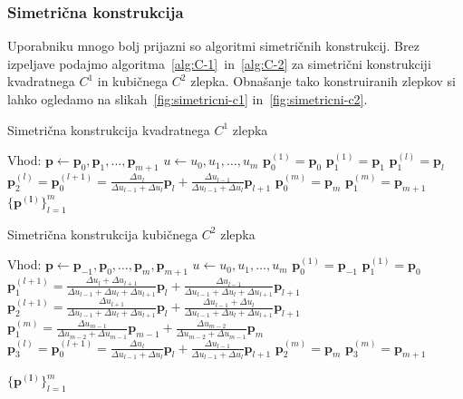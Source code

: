 \documentclass[isrm2, tisk]{fmfdelo}
\newcommand{\p}{\mathbf{p}}
\begin{document}
    \subsubsection{Simetrična konstrukcija}
    Uporabniku mnogo bolj prijazni so algoritmi simetričnih konstrukcij.
    Brez izpeljave podajmo algoritma~\ref{alg:C-1}~in~\ref{alg:C-2} za simetrični konstrukciji kvadratnega $C^1$ in kubičnega $C^2$ zlepka.
    Obnašanje tako konstruiranih zlepkov si lahko ogledamo na slikah~\ref{fig:simetricni-c1} in~\ref{fig:simetricni-c2}.
    \begin{algorithm}[H]
        \caption{Simetrična konstrukcija kvadratnega $C^1$ zlepka}
        \label{alg:C-1}
        \begin{algorithmic}
            \State Vhod:
            \State $\p \gets \p_0,\p_1,\dots,\p_{m+1}$
            \State $u \gets u_0,u_1,\dots,u_m$
            \State
            \State $\p_0^{(1)} = \p_0$
            \State $\p_1^{(1)} = \p_1$
                \State $\p_1^{(l)}=\p_{l}$
                \State $\p_2^{(l)} = \p_0^{(l+1)} = \frac{\Delta u_l}{\Delta u_{l-1} + \Delta u_{l}}\p_l+\frac{\Delta u_{l-1}}{\Delta u_{l-1} + \Delta u_{l}}\p_{l+1}$
            \EndFor
            \State $\p_0^{(m)} = \p_m$
            \State $\p_1^{(m)} = \p_{m+1}$
            \State
            \State \Return $\{\mathbf{p^{(l)}}\}^{m}_{l=1}$
        \end{algorithmic}
    \end{algorithm}
    \begin{algorithm}[H]
        \caption{Simetrična konstrukcija kubičnega $C^2$ zlepka}
        \label{alg:C-2}
        \begin{algorithmic}
            \State Vhod:
            \State $\p \gets \p_{-1},\p_0,\dots,\p_{m},\p_{m+1}$
            \State $u \gets u_0,u_1,\dots,u_m$
            \State
            \State $\p_0^{(1)} = \p_{-1}$
            \State $\p_1^{(1)} = \p_0$
                \State $\p_1^{(l+1)} = \frac{\Delta u_l + \Delta u_{l+1}}{\Delta u_{l-1} + \Delta u_{l}+ \Delta u_{l+1}}\p_l+\frac{\Delta u_{l-1}}{\Delta u_{l-1} + \Delta u_{l}+ \Delta u_{l+1}}\p_{l+1}$
                \State $\p_2^{(l+1)} = \frac{ \Delta u_{l+1}}{\Delta u_{l-1} + \Delta u_{l}+ \Delta u_{l+1}}\p_l+\frac{\Delta u_{l-1}+\Delta u_l }{\Delta u_{l-1} + \Delta u_{l}+ \Delta u_{l+1}}\p_{l+1}$
            \EndFor
            \State $\p_1^{(m)}= \frac{\Delta u_{m-1}}{\Delta u_{m-2} + \Delta u_{m-1}}\p_{m-1}+\frac{\Delta u_{m-2}}{\Delta u_{m-2} + \Delta u_{m-1}}\p_{m}$
                \State $\p_3^{(l)} = \p_0^{(l+1)} = \frac{\Delta u_l}{\Delta u_{l-1} + \Delta u_{l}}\p_l+\frac{\Delta u_{l-1}}{\Delta u_{l-1} + \Delta u_{l}}\p_{l+1}$
            \EndFor
            \State $\p_2^{(m)} = \p_m$
            \State $\p_3^{(m)} = \p_{m+1}$

            \State
            \State \Return $\{\mathbf{p^{(l)}}\}^{m}_{l=1}$
        \end{algorithmic}
    \end{algorithm}
\end{document}
